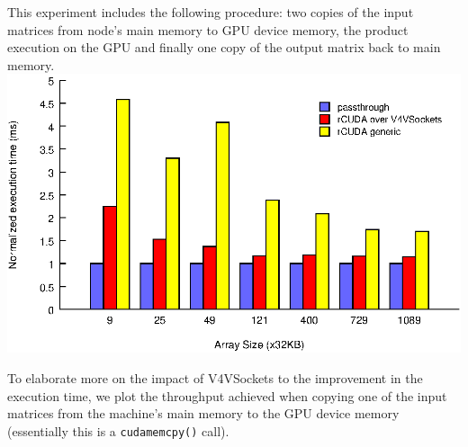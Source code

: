 \documentclass[a0paper,portrait,final]{baposter}
\begin{document}
\begin{poster}
{\begin{multicols}{2}
This experiment includes the following procedure: two copies of the input
matrices from node's main memory to GPU device memory, the product execution on
the GPU and finally one copy of the output matrix back to main memory. %
\includegraphics[width=\linewidth]{figures/total_cublas_time.eps}

\hspace{0.5em}

To elaborate more on the impact of V4VSockets to the improvement in the
execution time, we plot the throughput achieved when copying one of the input
matrices from the machine's main memory to the GPU device memory (essentially
this is a \texttt{cudamemcpy()} call).
\end{multicols}

}
\end{poster}
\end{document}
